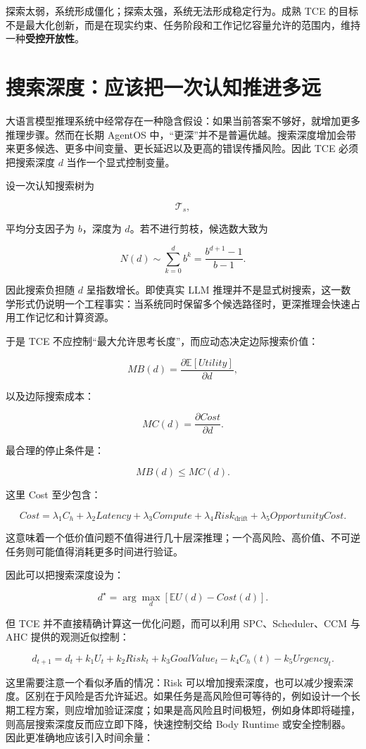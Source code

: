 探索太弱，系统形成僵化；探索太强，系统无法形成稳定行为。成熟 TCE 的目标不是最大化创新，而是在现实约束、任务阶段和工作记忆容量允许的范围内，维持一种\textbf{受控开放性}。

\section{搜索深度：应该把一次认知推进多远}

大语言模型推理系统中经常存在一种隐含假设：如果当前答案不够好，就增加更多推理步骤。然而在长期 AgentOS 中，“更深”并不是普遍优越。搜索深度增加会带来更多候选、更多中间变量、更长延迟以及更高的错误传播风险。因此 TCE 必须把搜索深度 $d$ 当作一个显式控制变量。

设一次认知搜索树为

\[
\mathcal T_s,
\]

平均分支因子为 $b$，深度为 $d$。若不进行剪枝，候选数大致为

\[
N(d)
\sim
\sum_{k=0}^{d}b^k
=
\frac{b^{d+1}-1}{b-1}.
\]

因此搜索负担随 $d$ 呈指数增长。即使真实 LLM 推理并不是显式树搜索，这一数学形式仍说明一个工程事实：当系统同时保留多个候选路径时，更深推理会快速占用工作记忆和计算资源。

于是 TCE 不应控制“最大允许思考长度”，而应动态决定边际搜索价值：

\[
MB(d)
=
\frac{
\partial \mathbb E[Utility]
}{
\partial d
},
\]

以及边际搜索成本：

\[
MC(d)
=
\frac{
\partial Cost
}{
\partial d
}.
\]

最合理的停止条件是：

\[
MB(d)
\le
MC(d).
\]

这里 Cost 至少包含：

\[
Cost
=
\lambda_1C_h
+
\lambda_2Latency
+
\lambda_3Compute
+
\lambda_4Risk_{\mathrm{drift}}
+
\lambda_5OpportunityCost.
\]

这意味着一个低价值问题不值得进行几十层深推理；一个高风险、高价值、不可逆任务则可能值得消耗更多时间进行验证。

因此可以把搜索深度设为：

\[
d^\star
=
\arg\max_d
\left[
\mathbb E U(d)-Cost(d)
\right].
\]

但 TCE 并不直接精确计算这一优化问题，而可以利用 SPC、Scheduler、CCM 与 AHC 提供的观测近似控制：

\[
d_{t+1}
=
d_t
+
k_1U_t
+
k_2Risk_t
+
k_3GoalValue_t
-
k_4C_h(t)
-
k_5Urgency_t.
\]

这里需要注意一个看似矛盾的情况：Risk 可以增加搜索深度，也可以减少搜索深度。区别在于风险是否允许延迟。如果任务是高风险但可等待的，例如设计一个长期工程方案，则应增加验证深度；如果是高风险且时间极短，例如身体即将碰撞，则高层搜索深度反而应立即下降，快速控制交给 Body Runtime 或安全控制器。因此更准确地应该引入时间余量：

